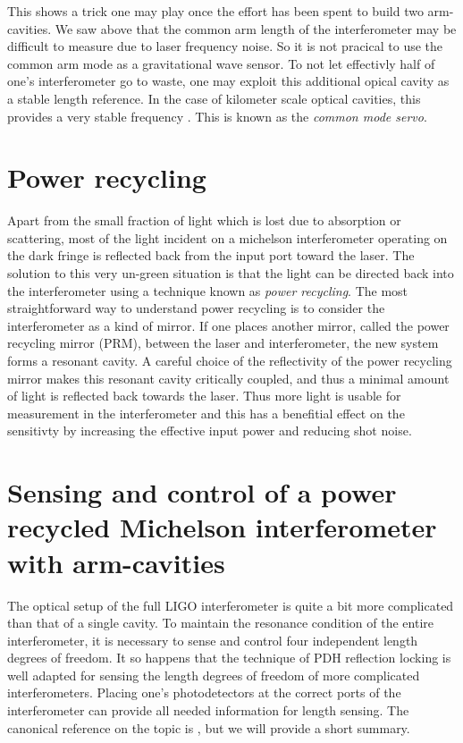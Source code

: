This shows a trick one may play once the effort has been spent to build two arm-cavities. %
We saw above that the common arm length of the interferometer may be difficult to measure due to laser frequency noise. %
So it is not pracical to use the common arm mode as a gravitational wave sensor. %
To not let effectivly half of one's interferometer go to waste, one may exploit this additional opical cavity as a stable length reference. %
In the case of kilometer scale optical cavities, this provides a very stable frequency . %
This is known as the \emph{common mode servo}.

\section{Power recycling}
Apart from the small fraction of light which is lost due to absorption or scattering, most of the light incident on a michelson interferometer operating on the dark fringe is reflected back from the input port toward the laser. %
The solution to this very un-green situation is that the light can be directed back into the interferometer using a technique known as \emph{power recycling}. %
The most straightforward way to understand power recycling is to consider the interferometer as a kind of mirror. %
If one places another mirror, called the power recycling mirror (PRM), between the laser and interferometer, the new system forms a resonant cavity. %
A careful choice of the reflectivity of the power recycling mirror makes this resonant cavity critically coupled, and thus a minimal amount of light is reflected back towards the laser. %
Thus more light is usable for measurement in the interferometer and this has a benefitial effect on the sensitivty by increasing the effective input power and reducing shot noise.

\section{Sensing and control of a power recycled Michelson interferometer with arm-cavities}
The optical setup of the full LIGO interferometer is quite a bit more complicated than that of a single cavity. %
To maintain the resonance condition of the entire interferometer, it is necessary to sense and control four independent length degrees of freedom. %
It so happens that the technique of PDH reflection locking is well adapted for sensing the length degrees of freedom of more complicated interferometers. %
Placing one's photodetectors at the correct ports of the interferometer can provide all needed information for length sensing. %
The canonical reference on the topic is \citet{Fritschel:01}, but we will provide a short summary.

